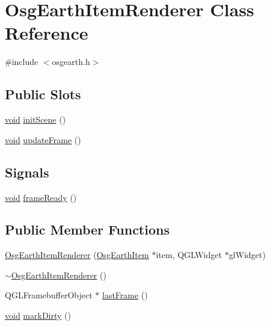 \hypertarget{class_osg_earth_item_renderer}{\section{\-Osg\-Earth\-Item\-Renderer \-Class \-Reference}
\label{class_osg_earth_item_renderer}
}


{\ttfamily \#include $<$osgearth.\-h$>$}

\subsection*{\-Public \-Slots}
\begin{DoxyCompactItemize}
\item 
\hyperlink{group___u_a_v_objects_plugin_ga444cf2ff3f0ecbe028adce838d373f5c}{void} \hyperlink{class_osg_earth_item_renderer_a2f761da4a4416337b6ef107b07dc211a}{init\-Scene} ()
\item 
\hyperlink{group___u_a_v_objects_plugin_ga444cf2ff3f0ecbe028adce838d373f5c}{void} \hyperlink{class_osg_earth_item_renderer_a5e3695b2241bc4dd17066706ae9e6ed5}{update\-Frame} ()
\end{DoxyCompactItemize}
\subsection*{\-Signals}
\begin{DoxyCompactItemize}
\item 
\hyperlink{group___u_a_v_objects_plugin_ga444cf2ff3f0ecbe028adce838d373f5c}{void} \hyperlink{class_osg_earth_item_renderer_a75e132a88d250808260ba670b734ec99}{frame\-Ready} ()
\end{DoxyCompactItemize}
\subsection*{\-Public \-Member \-Functions}
\begin{DoxyCompactItemize}
\item 
\hyperlink{class_osg_earth_item_renderer_aa27b2dc0eec2d8b23219dd972652ed2a}{\-Osg\-Earth\-Item\-Renderer} (\hyperlink{class_osg_earth_item}{\-Osg\-Earth\-Item} $\ast$item, \-Q\-G\-L\-Widget $\ast$gl\-Widget)
\item 
\hyperlink{class_osg_earth_item_renderer_a4979f419da0868a3b780d72b21df58ab}{$\sim$\-Osg\-Earth\-Item\-Renderer} ()
\item 
\-Q\-G\-L\-Framebuffer\-Object $\ast$ \hyperlink{class_osg_earth_item_renderer_aba3817e44a7c7071578f5faa6e83e1e3}{last\-Frame} ()
\item 
\hyperlink{group___u_a_v_objects_plugin_ga444cf2ff3f0ecbe028adce838d373f5c}{void} \hyperlink{class_osg_earth_item_renderer_a8f8eac59f9302a634e4ffde04e8f3e32}{mark\-Dirty} ()
\end{DoxyCompactItemize}


